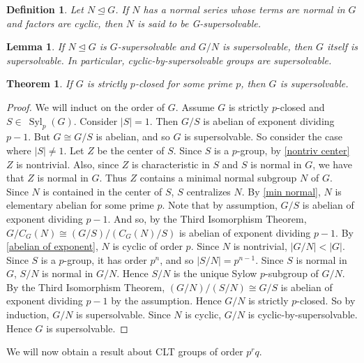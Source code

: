 \documentclass[12pt]{report}
\theoremstyle{newthm}
\newtheorem{Theorem}[lem]{Theorem}
\newtheorem{Definition}[lem]{Definition}
\newtheorem{Lemma}[lem]{Lemma}
\DeclareMathOperator{\Syl}{Syl}
\begin{document}
\begin{Definition}
Let $N\trianglelefteq G$. If $N$ has a normal series whose terms are normal in $G$ and factors are cyclic, then $N$ is said to be \textit{G-supersolvable}.
\end{Definition}

\begin{Lemma}\label{super N and G/N} If $N\trianglelefteq G$ is $G$-supersolvable and $G/N$ is supersolvable, then $G$ itself is supersolvable. In particular, cyclic-by-supersolvable groups are supersolvable.

\end{Lemma}

\begin{Theorem}\label{strict p closed super}\cite[Proposition 4.4]{Pinnock}
If $G$ is strictly $p$-closed for some prime $p$, then $G$ is supersolvable.
\end{Theorem}

\begin{proof}
We will induct on the order of $G$. Assume $G$ is strictly $p$-closed and $S\in~\Syl_p(G)$. Consider $|S|=1$. Then $G/S$ is abelian of exponent dividing $p-1$. But $G\cong G/S$ is abelian, and so $G$ is supersolvable. So consider the case where $|S|\neq 1$. Let $Z$ be the center of $S$. Since $S$ is a $p$-group, by \cref{nontriv center} $Z$ is nontrivial. Also, since $Z$ is characteristic in $S$ and $S$ is normal in $G$, we have that $Z$ is normal in $G$. Thus $Z$ contains a minimal normal subgroup $N$ of $G$. Since $N$ is contained in the center of $S$, $S$ centralizes $N$. By \cref{min normal}, $N$ is elementary abelian for some prime $p$. Note that by assumption, $G/S$ is abelian of exponent dividing $p-1$. And so, by the Third Isomorphism Theorem, $G/C_G(N)\cong (G/S)/(C_G(N)/S)$ is abelian of exponent dividing $p-1$. By \cref{abelian of exponent}, $N$ is cyclic of order $p$. Since $N$ is nontrivial, $|G/N| <|G|$. Since $S$ is a $p$-group, it has order $p^n$, and so $|S/N|=p^{n-1}$. Since $S$ is normal in $G$, $S/N$ is normal in $G/N$. Hence $S/N$ is the unique Sylow $p$-subgroup of $G/N$. By the Third Isomorphism Theorem, $(G/N)/(S/N)\cong G/S$ is abelian of exponent dividing $p-1$ by the assumption. Hence $G/N$ is strictly $p$-closed. So by induction, $G/N$ is supersolvable. Since $N$ is cyclic, $G/N$ is cyclic-by-supersolvable. Hence $G$ is supersolvable.
\end{proof}

We will now obtain a result about CLT groups of order $p^rq$.
\end{document}

